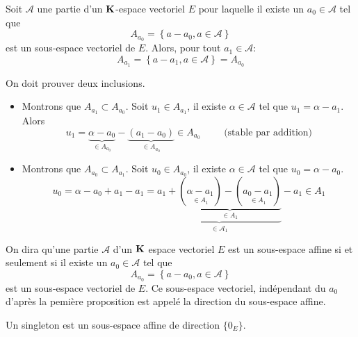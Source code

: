 \begin{prop}
 Soit $\mathcal A$ une partie d'un $\mathbf{K}$-espace vectoriel $E$ pour laquelle il existe un $a_0\in\mathcal A$ tel que 
\begin{displaymath}
 A_{a_0} = \left\lbrace a-a_0, a\in \mathcal A\right\rbrace 
\end{displaymath}
est un sous-espace vectoriel de $E$. Alors, pour tout $a_1\in \mathcal A$:
\begin{displaymath}
 A_{a_1} = \left\lbrace a-a_1, a\in \mathcal A\right\rbrace = A_{a_0} 
\end{displaymath}
\end{prop}
\begin{demo}
 On doit prouver deux inclusions.
\begin{itemize}
 \item Montrons que $A_{a_1}\subset A_{a_0}$. Soit $u_1\in A_{a_1}$, il existe $\alpha\in \mathcal{A}$ tel que $u_1=\alpha - a_1$. Alors
\begin{displaymath}
 u_1 = \underset{\in A_{a_0}}{\underbrace{\alpha - a_0}} -\underset{\in A_{a_0}}{\underbrace{(a_1-a_0)}} \in A_{a_0} \hspace{1cm}\text{(stable par addition)}
\end{displaymath}
 \item Montrons que $A_{a_0}\subset A_{a_1}$. Soit $u_0\in A_{a_0}$, il existe $\alpha\in \mathcal{A}$ tel que $u_0=\alpha - a_0$.
\begin{displaymath}
 u_0 = \alpha -a_0 + a_1 -a_1 = 
\underset{\in \mathcal{A}_1}{\underbrace{a_1 + \underset{\in A_1}{\underbrace{(\underset{\in A_1}{\alpha -a_1})-(\underset{\in A_1}{a_0-a_1})}}}} -a_1 \in A_1
\end{displaymath}
\end{itemize}

\end{demo}
\begin{defi}
 On dira qu'une partie $\mathcal A$ d'un $\mathbf{K}$ espace vectoriel $E$ est un sous-espace affine si et seulement si il existe un $a_0\in\mathcal A$ tel que 
\begin{displaymath}
 A_{a_0} = \left\lbrace a-a_0, a\in \mathcal A\right\rbrace 
\end{displaymath}
est un sous-espace vectoriel de $E$. Ce sous-espace vectoriel, indépendant du $a_0$ d'après la pemière proposition est appelé la direction du sous-espace affine.
\end{defi}
\begin{rem}
 Un singleton est un sous-espace affine de direction $\{0_E\}$.
\end{rem}
